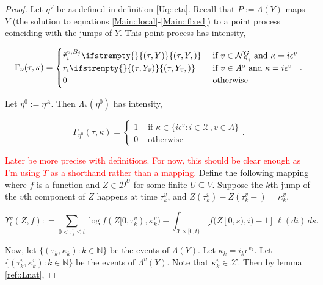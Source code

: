 \documentclass[12pt]{article}
\newcommand{\mb}{\mathbb}
\newcommand{\mc}{\mathcal}
\newcommand{\ov}{\overline}
\newcommand{\te}{\text}
\newcommand{\ep}{\epsilon}
\newcommand{\tr}{\textcolor{red}}
\newcommand{\defeq}{:=}								%
\newcommand{\cad}{\mc{D}}							%
\newcommand{\sta}{\mc{X}}							%
\newcommand{\gneigh}[2]{\mc{N}^{#1}_{#2}}			%
\newcommand{\cl}[1]{\ov{#1}}						%
\newcommand{\indx}[1]{^{#1}}						%
\newcommand{\Sm}{\ell}								%
\newcommand{\rate}{r}								%
\newcommand{\vind}[1]{_{#1}}						%
\newcommand{\tme}[1]{(#1)}							%
\newcommand{\tmi}[1]{#1}							%
\newcommand{\vpara}[1]{^{#1}}						%
\newcommand{\stpara}[1]{_{#1}}						%
\newcommand{\tpara}[1]{_{#1}}						%
\newcommand{\psf}{_*}								%
\newcommand{\tmepro}[3]{
\ifstrempty{#3}{
	\left(#1,#2\right)}{
	\left(#1,#2,#3\right)}}							%
\newcommand{\Xg}{Y}									%
\newcommand{\brate}{\alt{\rate}}					%
\newcommand{\inte}[1]{{#1}^\mathrm{o}}				%
\newcommand{\alt}[1]{\tilde{#1}}					%
\newcommand{\pmap}{\Lambda}							%
\newcommand{\rt}{\tau}								%
\renewcommand{\mark}{\kappa}						%
\newcommand{\ratee}{\Gamma}							%
\newcommand{\rp}{P}									%
\newcommand{\mm}{\nu}								%
\newcommand{\ev}[1]{\ep^{#1}}						%
\newcommand{\Xh}{Z}									%
\newcommand{\mmm}{\eta}								%
\newcommand{\ds}{\Upsilon}							%
\newcommand{\prc}[1]{_{#1}}							%
\renewcommand{\it}[1]{_{#1}}						%
\newcommand{\vjpara}[2]{^{#1,#2}}					%
\begin{document}
\begin{proof}
Let \(\mmm\vpara{V}\) be as defined in definition \ref{Uq::eta}. Recall that \(\rp\defeq \pmap(\Xg)\) maps \(\Xg\) (the solution to equations \eqref{Main::local}-\eqref{Main::fixed}) to a point process coinciding with the jumps of \(\Xg\). This point process has intensity,

\[\ratee\prc{\mm}(\rt,\mark) = \begin{cases}
\brate\vjpara{v}{B_j}\stpara{i}\tmepro{\rt}{\Xg}{} &\te{ if } v \in \gneigh{G}{B_j}\te{ and } \mark = i\ev{v}\\
\rate\stpara{i}\tmepro{\rt}{\Xg\vind{\cl{v}}}{} &\te{ if } v \in \inte{A}\te{ and } \mark = i\ev{v}\\
0 &\te{ otherwise}
\end{cases}.\]

Let \(\mmm\indx{0} \defeq \mmm\vpara{A}\). Then \(\pmap\psf(\mmm\indx{0})\) has intensity,

\[\ratee\prc{\mmm\indx{0}}(\rt,\mark) = 
\begin{cases}
1 &\te{ if } \mark\in  \{i\ev{v}: i \in \sta,v \in A\}\\
0 &\te{ otherwise}
\end{cases}.\]

\tr{Later be more precise with definitions. For now, this should be clear enough as I'm using \(\ds\) as a shorthand rather than a mapping.} Define the following mapping where \(f\) is a function and \(\Xh \in \cad\vpara{U}\) for some finite \(U \subseteq V\). Suppose the \(k\)th jump of the \(v\)th component of \(\Xh\) happens at time \(\rt\vpara{v}\it{k}\), and \(\Xh\tme{\rt\vpara{v}\it{k}} - \Xh\tme{\rt\vpara{v}\it{k}-} = \mark\vpara{v}\it{k}\). 

\begin{equation}
\ds\vpara{v}\tpara{t}(\Xh,f): = \sum_{0 < \rt\vpara{v}\it{k}\leq t} \log f(\Xh\tmi{[0,\rt\vpara{v}\it{k})},\mark\vpara{v}\it{k}) - \int_{\sta\times[0,t)} [f(\Xh\tmi{[0,s)},i) - 1]\,\Sm(di)\,ds.
\label{Uq::ds}
\end{equation}

Now, let \(\{(\rt\it{k},\mark\it{k}):k\in\mb{N}\}\) be the events of \(\pmap(\Xg)\). Let \(\mark\it{k} = i\it{k}\ev{v\it{k}}\). Let \(\{(\rt\it{k}\vpara{v},\mark\it{k}\vpara{v}):k\in\mb{N}\}\) be the events of \(\pmap\vpara{v}(\Xg)\). Note that \(\mark\it{k}\vpara{v} \in \sta\). Then by lemma \ref{ref::Lnat},


\end{proof}
\end{document}
